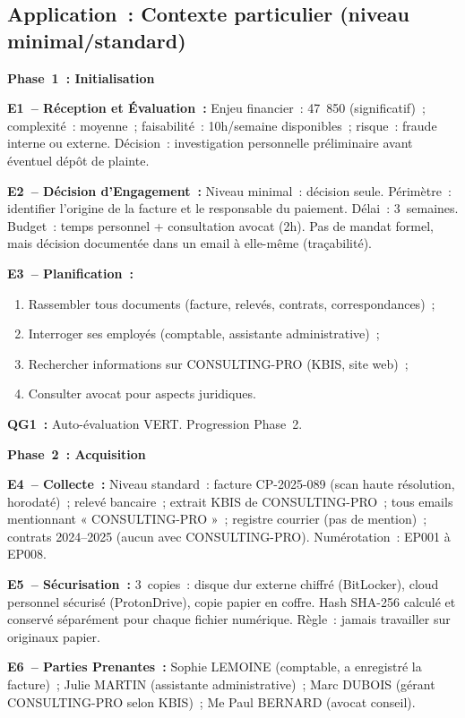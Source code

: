 \subsection{Application~: Contexte particulier (niveau minimal/standard)}

\textbf{Phase~1~: Initialisation}

\textbf{E1~-- Réception et Évaluation~:} Enjeu financier~: 47~850 (significatif)~;
complexité~: moyenne~; faisabilité~: 10h/semaine disponibles~;
risque~: fraude interne ou externe. Décision~: investigation personnelle
préliminaire avant éventuel dépôt de plainte.

\textbf{E2~-- Décision d'Engagement~:} Niveau minimal~: décision seule.
Périmètre~: identifier l'origine de la facture et le responsable du paiement.
Délai~: 3~semaines. Budget~: temps personnel + consultation avocat (2h).
Pas de mandat formel, mais décision documentée dans un email à elle-même
(traçabilité).

\textbf{E3~-- Planification~:}
\begin{enumerate}
    \item Rassembler tous documents (facture, relevés, contrats,
          correspondances)~;
    \item Interroger ses employés (comptable, assistante administrative)~;
    \item Rechercher informations sur CONSULTING-PRO (KBIS, site web)~;
    \item Consulter avocat pour aspects juridiques.
\end{enumerate}
\textbf{QG1~:} Auto-évaluation VERT. Progression Phase~2.

\textbf{Phase~2~: Acquisition}

\textbf{E4~-- Collecte~:} Niveau standard~: facture CP-2025-089 (scan haute
résolution, horodaté)~; relevé bancaire~; extrait KBIS de CONSULTING-PRO~;
tous emails mentionnant « CONSULTING-PRO »~; registre courrier (pas de
mention)~; contrats 2024--2025 (aucun avec CONSULTING-PRO). Numérotation~:
EP001 à EP008.

\textbf{E5~-- Sécurisation~:} 3~copies~: disque dur externe chiffré (BitLocker),
cloud personnel sécurisé (ProtonDrive), copie papier en coffre. Hash SHA-256
calculé et conservé séparément pour chaque fichier numérique. Règle~: jamais
travailler sur originaux papier.

\textbf{E6~-- Parties Prenantes~:} Sophie LEMOINE (comptable, a enregistré
la facture)~; Julie MARTIN (assistante administrative)~; Marc DUBOIS (gérant
CONSULTING-PRO selon KBIS)~; Me Paul BERNARD (avocat conseil).

